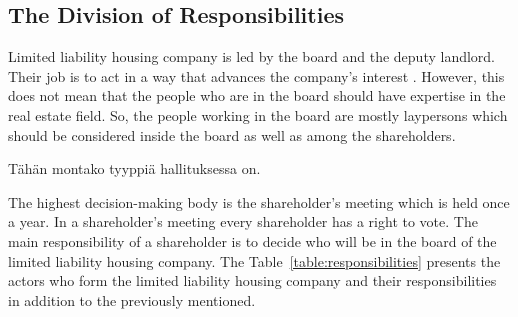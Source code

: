\subsection{The Division of Responsibilities}

Limited liability housing company is led by the board and the deputy landlord. Their job is to act in a way that advances the company's interest \parencite{LLHA:2}. However, this does not mean that the people who are in the board should have expertise in the real estate field. So, the people working in the board are mostly laypersons which should be considered inside the board as well as among the shareholders. \parencite{Hallintotapa:2017}

Tähän montako tyyppiä hallituksessa on.

The highest decision-making body is the shareholder's meeting which is held once a year. In a shareholder's meeting every shareholder has a right to vote. The main responsibility of a shareholder is to decide who will be in the board of the limited liability housing company. The Table~\ref{table:responsibilities} presents the actors who form the limited liability housing company and their responsibilities in addition to the previously mentioned. \parencite{RantanenViiala:2015} 

